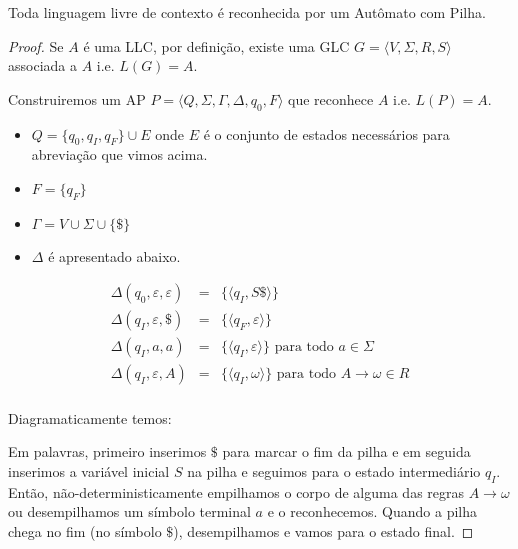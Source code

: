 \begin{theorem}
  Toda linguagem livre de contexto é reconhecida por um Autômato com Pilha.
\end{theorem}
\begin{proof}
  Se $A$ é uma LLC, por definição, existe uma GLC $G = \langle V, \Sigma, R, S \rangle$ associada a $A$ i.e. $L(G) = A$.

  Construiremos um AP $P = \langle Q, \Sigma, \Gamma, \Delta, q_0, F \rangle$ que reconhece $A$ i.e. $L(P) = A$.

  \begin{itemize}
  \item $Q = \{q_0, q_I, q_F\} \cup E$ onde $E$ é o conjunto de estados necessários para abreviação que vimos acima.
  \item $F = \{q_F\}$
  \item $\Gamma = V \cup \Sigma \cup \{\$\}$
  \item $\Delta$ é apresentado abaixo.
  \end{itemize}


  \begin{eqnarray*}
    \Delta(q_0, \varepsilon, \varepsilon) & = & \{\langle q_I, S\$ \rangle\}\\
    \Delta(q_I, \varepsilon, \$) & = & \{\langle q_F, \varepsilon \rangle\}\\  
    \Delta(q_I, a, a) & = & \{\langle q_I, \varepsilon \rangle\} \textrm{ para todo } a \in \Sigma\\
    \Delta(q_I, \varepsilon, A) & = & \{\langle q_I, \omega \rangle\} \textrm{ para todo } A \to \omega \in R\\
  \end{eqnarray*}

  Diagramaticamente temos:

  \begin{center}
  \end{center}

Em palavras, primeiro inserimos $\$$ para marcar o fim da pilha e em seguida inserimos a variável inicial $S$ na pilha e seguimos para o estado intermediário $q_I$.
Então, não-deterministicamente empilhamos o corpo de alguma das regras $A \to \omega$ ou desempilhamos um símbolo terminal $a$ e o reconhecemos.
Quando a pilha chega no fim (no símbolo $\$$), desempilhamos e vamos para o estado final.  
\end{proof}


